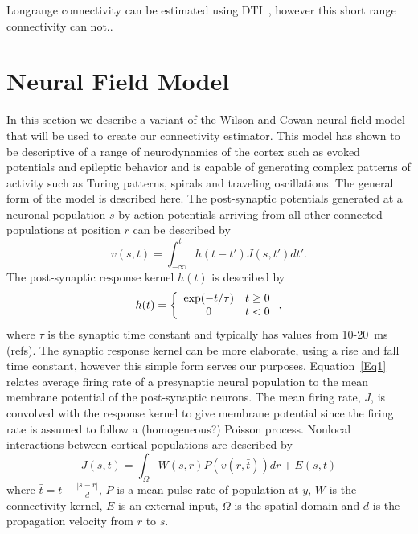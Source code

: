 \documentclass[journal]{IEEEtran}
\begin{document}
Longrange connectivity can be estimated using DTI~\cite{Knock2009}, however this short range connectivity can not..

\section{Neural Field Model}
In this section we describe a variant of the  Wilson and Cowan neural field model~\cite{Wilson1973} that will be used to create our connectivity estimator. This model has shown to be descriptive of a range of neurodynamics of the cortex such as evoked potentials and epileptic behavior and is capable of generating complex patterns of activity such as Turing patterns, spirals and traveling oscillations. The general form of the model is described here. The post-synaptic potentials generated at a neuronal population $s$ by action potentials arriving from all other connected populations at position $r$ can be described by
\begin{equation}\label{Eq1}
v\left( {s,t} \right) = \int_{ - \infty }^t {h\left( {t - t'} \right)J\left( {s,t'} \right)dt'}.
\end{equation}
The post-synaptic response kernel $h(t)$ is described by
\begin{equation}\label{Eq2}
h(t) = \left\{ {\begin{array}{*{20}{c}}
   {\exp ( - {t \mathord{\left/
 {\vphantom {t \tau }} \right.
 \kern-\nulldelimiterspace} \tau })} & {t \ge 0}  \\
   0 & {t < 0}  \\
\end{array}} \right.,
\end{equation}
where $\tau$ is the synaptic time constant and typically has values from 10-20~ms (\textcolor[rgb]{1.00,0.00,0.00}{refs}). The synaptic response kernel can be more elaborate, using a rise and fall time constant, however this simple form serves our purposes. Equation~\ref{Eq1} relates average firing rate of a presynaptic neural population to the mean membrane potential of the post-synaptic neurons. The mean firing rate, $J$, is convolved with the response kernel to give membrane potential since the firing rate is assumed to follow a (homogeneous?) Poisson process. Nonlocal interactions between cortical populations are described by	
\begin{equation}\label{Eq3}
J\left( {s,t} \right) = \int_\Omega  {W\left( {s,r} \right)P\left( {v\left( {r,\bar t} \right)} \right)dr}  + E\left( {s,t} \right)
\end{equation}
where $\bar t = t - \frac{{\left| {s - r} \right|}}{d}$, $P$ is a mean pulse rate of population at $y$, $W$ is the connectivity kernel, $E$ is an external input, $\Omega$ is the spatial domain and $d$ is the propagation velocity from $r$ to $s$.
\end{document}
